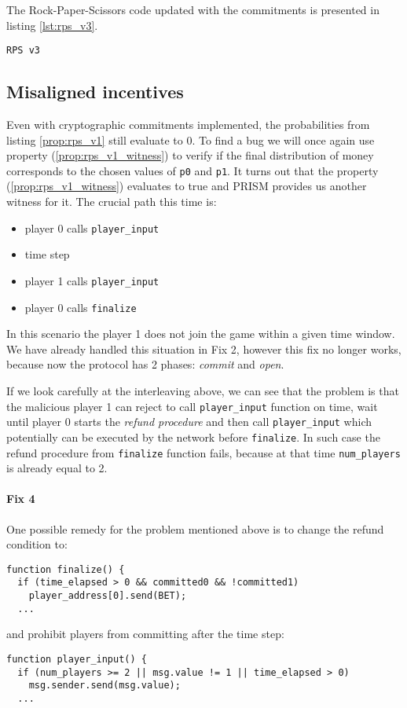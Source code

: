 The Rock-Paper-Scissors code updated with the commitments is presented in listing \ref{lst:rps_v3}.

%
\begin{lstlisting}[caption=RPS v3, label=lst:rps_v3]
RPS v3
\end{lstlisting}


\subsection{Misaligned incentives}

Even with cryptographic commitments implemented, the probabilities from listing \ref{prop:rps_v1} still evaluate to 0.
To find a bug we will once again use property (\ref{prop:rps_v1_witness}) to verify if the final distribution of money
corresponds to the chosen values of \lstinline{p0} and \lstinline{p1}.
It turns out that the property (\ref{prop:rps_v1_witness}) evaluates to true and PRISM provides us another witness 
for it. The crucial path this time is:
\begin{itemize}
\item player 0 calls \lstinline{player_input}
\item time step
\item player 1 calls \lstinline{player_input}
\item player 0 calls \lstinline{finalize}
\end{itemize}
In this scenario the player 1 does not join the game within a given time window.
We have already handled this situation in Fix 2, however this fix no longer works, because now the protocol
has 2 phases: \emph{commit} and \emph{open}.

If we look carefully at the interleaving above, we can see that the problem is
that the malicious player 1 can reject to call \lstinline{player_input} function on time, wait until player 0 starts
the \emph{refund procedure} and then call \lstinline{player_input} which potentially can be executed by the 
network before \lstinline{finalize}.
In such case the refund procedure from \lstinline{finalize} function fails, because at that time
\lstinline{num_players} is already equal to 2.

\paragraph{Fix 4}

One possible remedy for the problem mentioned above is to change the refund condition to:
\begin{lstlisting}
function finalize() {
  if (time_elapsed > 0 && committed0 && !committed1)
    player_address[0].send(BET);
  ...
\end{lstlisting}
and prohibit players from committing after the time step:
\begin{lstlisting}
function player_input() {
  if (num_players >= 2 || msg.value != 1 || time_elapsed > 0)
    msg.sender.send(msg.value);
  ...
\end{lstlisting}

